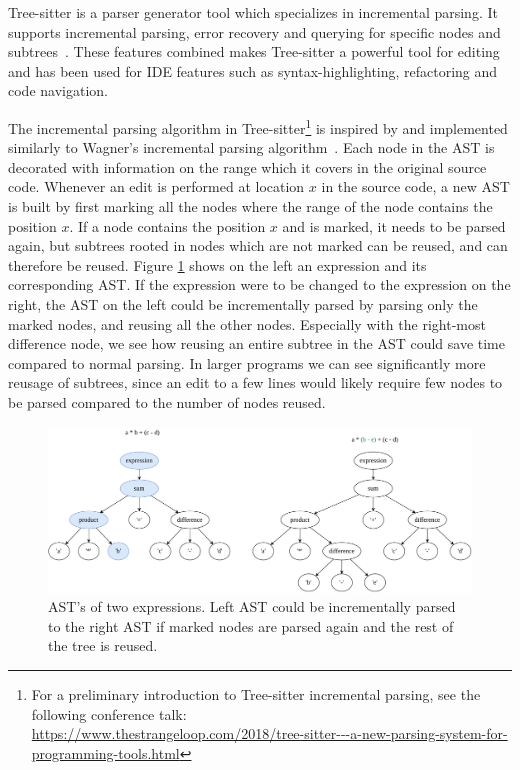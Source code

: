 Tree-sitter is a parser generator tool which specializes in incremental parsing. It
supports incremental parsing, error recovery and querying for specific nodes and
subtrees~\cite{treesitter}. These features combined makes Tree-sitter a powerful tool for
editing and has been used for IDE features such as syntax-highlighting, refactoring and
code navigation.

The incremental parsing algorithm in Tree-sitter\footnote{For a preliminary introduction
to Tree-sitter incremental parsing, see the following conference talk:\\
\url{https://www.thestrangeloop.com/2018/tree-sitter---a-new-parsing-system-for-programming-tools.html}}
is inspired by and implemented similarly to Wagner's incremental parsing
algorithm~\cite{PracticalAlgorithmsForIncremental}. Each node in the AST is decorated with
information on the range which it covers in the original source code. Whenever an edit is
performed at location $x$ in the source code, a new AST is built by first marking all the
nodes where the range of the node contains the position $x$. If a node contains the
position $x$ and is marked, it needs to be parsed again, but subtrees rooted in nodes
which are not marked can be reused, and can therefore be reused. Figure
\ref{fig:incrementalparsing} shows on the left an expression and its corresponding AST. If
the expression were to be changed to the expression on the right, the AST on the left
could be incrementally parsed by parsing only the marked nodes, and reusing all the other
nodes. Especially with the right-most difference node, we see how reusing an entire
subtree in the AST could save time compared to normal parsing. In larger programs we can
see significantly more reusage of subtrees, since an edit to a few lines would likely
require few nodes to be parsed compared to the number of nodes reused.

\begin{figure}[t]
    \begin{center}
        \includegraphics[width=1\textwidth]{figures/incrementalparsing.drawio.pdf}
    \end{center}
    \caption{AST's of two expressions. Left AST could be incrementally parsed to
        the right AST if marked nodes are parsed again and the rest of the tree is reused.}
    \label{fig:incrementalparsing}
\end{figure}


